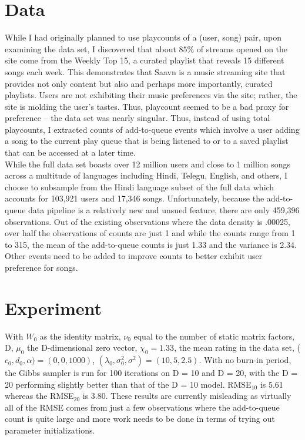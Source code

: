 \documentclass{article}
\begin{document}
\newpage
\section{Data}
While I had originally planned to use playcounts of a (user, song) pair, upon examining the data set, I discovered that about $85\%$ of streams opened on the site come from the Weekly Top 15, a curated playlist that reveals 15 different songs each week. This demonstrates that Saavn is a music streaming site that provides not only content but also and perhaps more importantly, curated playlists. Users are not exhibiting their music preferences via the site; rather, the site is molding the user's tastes.  Thus, playcount seemed to be a bad proxy for preference -- the data set was nearly singular.
Thus, instead of using total playcounts, I extracted counts of add-to-queue events which involve a user adding a song to the current play queue that is being listened to or to a saved playlist that can be accessed at a later time.  \\

\noindent
While the full data set boasts over 12 million users and close to 1 million songs across a multitude of languages including Hindi, Telegu, English, and others, I choose to subsample from the Hindi language subset of the full data which accounts for 103,921 users and 17,346 songs.  Unfortunately, because the add-to-queue data pipeline is a relatively new and unsued feature, there are only 459,396 observations.  Out of the existing observations where the data density is .00025, over half the observations of counts are just 1 and while the counts range from 1 to 315, the mean of the add-to-queue counts is just 1.33 and the variance is 2.34. Other events need to be added to improve counts to better exhibit user preference for songs.

\section{Experiment}
With $W_0$ as the identity matrix, $\nu_0$ equal to the number of static matrix factors, D, $\mu_0$ the D-dimensional zero vector, $\chi_0 = 1.33$, the mean rating in the data set, ($ c_0, d_0, \alpha ) = (0, 0, 1000) $, $( \lambda_0, \sigma_0^2, \sigma^2) = (10, 5, 2.5)$. With no burn-in period, the Gibbs sampler is run for 100 iterations on D = 10 and D = 20, with the D = 20 performing slightly better than that of the D = 10 model.  RMSE$_{10}$ is 5.61 whereas the RMSE$_{20}$ is 3.80.  These results are currently misleading as virtually all of the RMSE comes from just a few observations where the add-to-queue count is quite large and more work needs to be done in terms of trying out parameter initializations. \\
\end{document}
